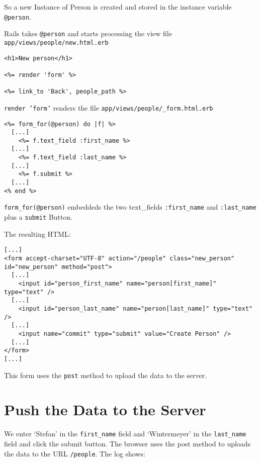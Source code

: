 \documentclass[a4paper]{book}
\begin{document}
So a new Instance of Person is created and stored in the instance variable \texttt{@person}.

Rails takes \texttt{@person} and starts processing the view file \texttt{app/views/people/new.html.erb}

\begin{shaded}\begin{verbatim}
<h1>New person</h1>

<%= render 'form' %>

<%= link_to 'Back', people_path %>
\end{verbatim}\end{shaded}

\texttt{render 'form'} renders the file \texttt{app/views/people/\_form.html.erb}

\begin{shaded}\begin{verbatim}
<%= form_for(@person) do |f| %>
  [...]
    <%= f.text_field :first_name %>
  [...]
    <%= f.text_field :last_name %>
  [...]
    <%= f.submit %>
  [...]
<% end %>
\end{verbatim}\end{shaded}

\texttt{form\_for(@person)} embeddeds the two text\_fields \texttt{:first\_name} and \texttt{:last\_name} plus a \texttt{submit} Button.

The resulting HTML:

\begin{shaded}\begin{verbatim}
[...]
<form accept-charset="UTF-8" action="/people" class="new_person" id="new_person" method="post">
  [...]
    <input id="person_first_name" name="person[first_name]" type="text" />
  [...]
    <input id="person_last_name" name="person[last_name]" type="text" />
  [...]
    <input name="commit" type="submit" value="Create Person" />
  [...]
</form>
[...]
\end{verbatim}\end{shaded}

This form uses the \texttt{post} method to upload the data to the server.

\section{Push the Data to the Server}\label{push-the-data-to-the-server}

We enter `Stefan' in the \texttt{first\_name} field and `Wintermeyer' in the \texttt{last\_name} field and click the submit button. The browser uses the post method to uploads the data to the URL \texttt{/people}. The log shows:
\end{document}
